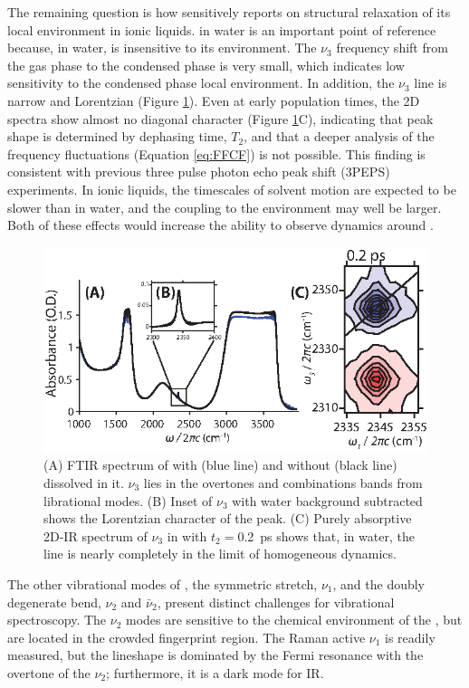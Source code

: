 The remaining question is how sensitively  reports on structural relaxation of its local environment in ionic liquids.  in water is an important point of reference because, in water,  is insensitive to its environment. The  $\nu_3$ frequency shift from the gas phase to the condensed phase is very small, which indicates low sensitivity to the condensed phase local environment.  In addition, the  $\nu_3$ line is narrow and Lorentzian (Figure \ref{fig:CO2 in water}). Even at early population times, the 2D spectra show almost no diagonal character (Figure \ref{fig:CO2 in water}C), indicating that peak shape is determined by dephasing time, $T_2$, and that a deeper analysis of the frequency fluctuations (Equation \ref{eq:FFCF}) is not possible. This finding is consistent with previous three pulse photon echo peak shift (3PEPS) experiments.\cite{Hamm1998} In ionic liquids, the timescales of solvent motion are expected to be slower than in water, and the coupling to the environment may well be larger. Both of these effects would increase the ability to observe dynamics around .
\begin{figure}
	\includegraphics{./anions/fig1.eps}
	\caption[Linear and 2D-IR of Carbon Dioxide in Water]{\label{fig:CO2 in water}(A) FTIR spectrum of  with (blue line) and without (black line)  dissolved in it.  $\nu_3$ lies in the overtones and combinations bands from  librational modes. (B) Inset of $\nu_3$ with water background subtracted shows the Lorentzian character of the peak. (C) Purely absorptive 2D-IR spectrum of $\nu_3$ in  with $t_2 =$\SI{0.2}{\ps} shows that, in water, the line is nearly completely in the limit of homogeneous dynamics.}
\end{figure}

The other vibrational modes of , the symmetric stretch, $\nu_1$, and the doubly degenerate bend, $\nu_2$ and $\bar{\nu}_2$, present distinct challenges for vibrational spectroscopy. The $\nu_2$ modes are sensitive to the chemical environment of the ,\cite{Meredith1996,Kazarian2000} but are located in the crowded fingerprint region. The Raman active $\nu_1$ is readily measured, but the lineshape is dominated by the Fermi resonance with the overtone of the $\nu_2$;\cite{Cabaco2011} furthermore, it is a dark mode for IR.


